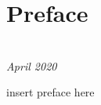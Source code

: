 \chapter*{Preface}


\begin{flushright}
{\makeatletter\itshape
    \@author \\
    
    April 2020
\makeatother}
\end{flushright}

insert preface here